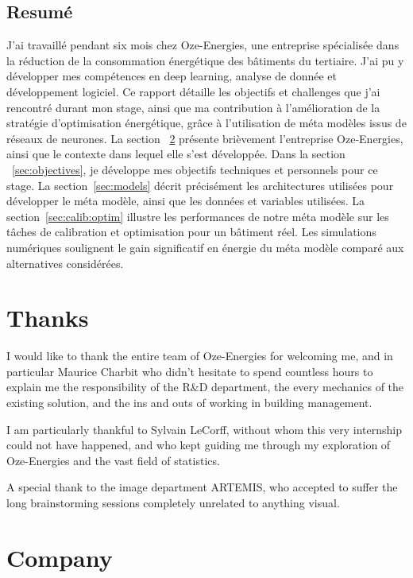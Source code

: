 \documentclass[12pt]{article}
\begin{document}
\subsection{Resumé}
J'ai travaillé pendant six mois chez Oze-Energies, une entreprise spécialisée dans la réduction de la consommation énergétique des bâtiments du tertiaire. J'ai pu y développer mes compétences en deep learning, analyse de donnée et développement logiciel. Ce rapport détaille les objectifs et challenges que j'ai rencontré durant mon stage, ainsi que ma contribution à l'amélioration de la stratégie d'optimisation énergétique, grâce à l'utilisation de méta modèles issus de réseaux de neurones. La section ~\ref{sec:company} présente brièvement l'entreprise Oze-Energies, ainsi que le contexte dans lequel elle s'est développée. Dans la section ~\ref{sec:objectives}, je développe mes objectifs techniques et personnels pour ce stage. La section~\ref{sec:models} décrit précisément les architectures utilisées pour développer le méta modèle, ainsi que les données et variables utilisées. La section~\ref{sec:calib:optim} illustre les performances de notre méta modèle sur les tâches de calibration et optimisation pour un bâtiment réel. Les simulations numériques soulignent le gain significatif en énergie du méta modèle comparé aux alternatives considérées.


\section{Thanks}
I would like to thank the entire team of Oze-Energies for welcoming me, and in particular Maurice Charbit who didn't hesitate to spend countless hours to explain me the responsibility of the R\&D department, the every mechanics of the existing solution, and the ins and outs of working in building management.

I am particularly thankful to Sylvain LeCorff, without whom this very internship could not have happened, and who kept guiding me through my exploration of Oze-Energies and the vast field of statistics.

A special thank to the image department ARTEMIS, who accepted to suffer the long brainstorming sessions completely unrelated to anything visual. 

\newpage

\section{Company}
\label{sec:company}
\end{document}
